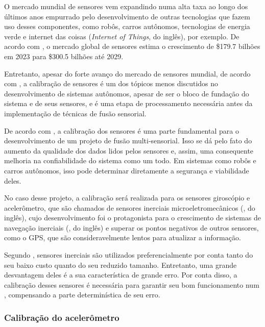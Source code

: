 \documentclass[acronym, symbols, table]{fei}
\begin{document}
		O mercado mundial de sensores vem expandindo numa alta taxa ao longo dos últimos anos empurrado pelo desenvolvimento de outras tecnologias que fazem uso desses componentes, como robôs, carros autônomos, tecnologias de energia verde e internet das coisas (\textit{Internet of Things}, do inglês), por exemplo. De acordo com \textcite{sensor_market}, o mercado global de sensores estima o crescimento de \$179.7 bilhões em 2023 para \$300.5 bilhões até 2029.
		
		Entretanto, apesar do forte avanço do mercado de sensores mundial, de acordo com \textcite{calibration_av}, a calibração de sensores é um dos tópicos menos discutidos no desenvolvimento de sistemas autônomos, apesar de ser o bloco de fundação do sistema e de seus sensores, e é uma etapa de processamento necessária antes da implementação de técnicas de fusão sensorial.
		
		De acordo com \textcite{lv2020targetless}, a calibração dos sensores é uma parte fundamental para o desenvolvimento de um projeto de fusão multi-sensorial. Isso se dá pelo fato do aumento da qualidade dos dados lidos pelos sensores e, assim, uma consequente melhoria na confiabilidade do sistema como um todo. Em sistemas como robôs e carros autônomos, isso pode determinar diretamente a segurança e viabilidade deles.
		
		No caso desse projeto, a calibração será realizada para os sensores giroscópio e acelerômetro, que são chamados de sensores inerciais microeletromecânicos (, do inglês), cujo desenvolvimento foi o protagonista para o crescimento de sistemas de navegação inerciais (, do inglês) e superar os pontos negativos de outros sensores, como o GPS, que são consideravelmente lentos para atualizar a informação.
		
		Segundo \textcite{9181212}, sensores inerciais  são utilizados preferencialmente por conta tanto do seu baixo custo quanto do seu reduzido tamanho. Entretanto, uma grande desvantagem deles é a sua característica de grande erro. Por conta disso, a calibração desses sensores é necessária para garantir seu bom funcionamento num , compensando a parte determinística de seu erro.
		
			\subsubsection{Calibração do acelerômetro} \label{sec:calibracao_acelerometro}
			
\end{document}
